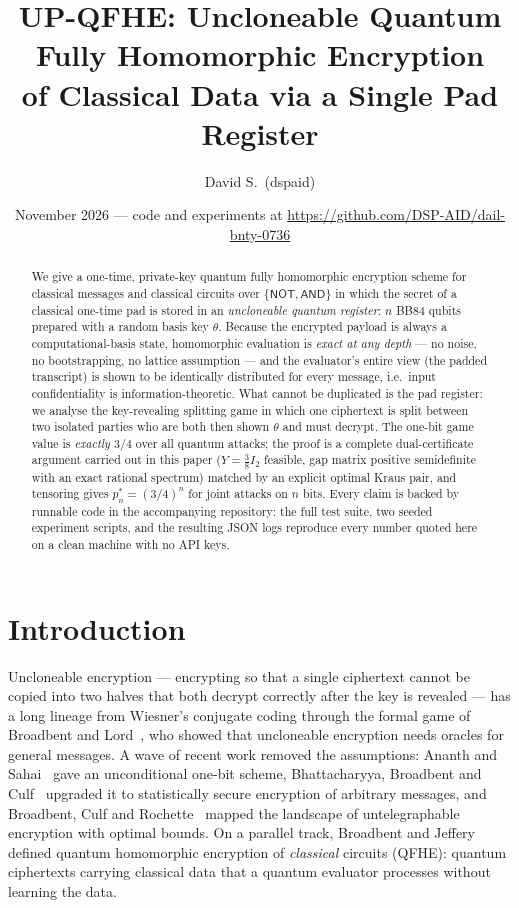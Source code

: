 \documentclass[11pt]{article}
\title{\bfseries UP-QFHE: Uncloneable Quantum Fully Homomorphic Encryption\\
of Classical Data via a Single Pad Register}
\author{David S.~(dspaid)}
\date{November 2026 --- code and experiments at \url{https://github.com/DSP-AID/dail-bnty-0736}}
\theoremstyle{definition}
\begin{document}
\maketitle

\begin{abstract}
We give a one-time, private-key quantum fully homomorphic encryption scheme for
classical messages and classical circuits over $\{\mathsf{NOT},\mathsf{AND}\}$
in which the secret of a classical one-time pad is stored in an \emph{uncloneable
quantum register}: $n$ BB84 qubits prepared with a random basis key $\theta$.
Because the encrypted payload is always a computational-basis state, homomorphic
evaluation is \emph{exact at any depth} --- no noise, no bootstrapping, no
lattice assumption --- and the evaluator's entire view (the padded transcript)
is shown to be identically distributed for every message, i.e.\ input
confidentiality is information-theoretic.  What cannot be duplicated is the pad
register: we analyse the key-revealing splitting game in which one ciphertext is
split between two isolated parties who are both then shown $\theta$ and must
decrypt.  The one-bit game value is \emph{exactly $3/4$} over all quantum
attacks; the proof is a complete dual-certificate argument carried out in this
paper ($Y=\tfrac38 I_2$ feasible, gap matrix positive semidefinite with an
exact rational spectrum) matched by an explicit optimal Kraus pair, and
tensoring gives $p_n^\ast = (3/4)^n$ for joint attacks on $n$ bits.  Every claim is backed by
runnable code in the accompanying repository: the full test suite, two seeded
experiment scripts, and the resulting JSON logs reproduce every number quoted
here on a clean machine with no API keys.
\end{abstract}

\section{Introduction}

Uncloneable encryption --- encrypting so that a single ciphertext cannot be
copied into two halves that both decrypt correctly after the key is revealed
--- has a long lineage from Wiesner's conjugate coding through the formal game
of Broadbent and Lord~\cite{bl20}, who showed that uncloneable encryption needs
oracles for general messages.  A wave of recent work removed the assumptions:
Ananth and Sahai~\cite{as26} gave an unconditional one-bit scheme, Bhattacharyya,
Broadbent and Culf~\cite{bbc26} upgraded it to statistically secure encryption
of arbitrary messages, and Broadbent, Culf and Rochette~\cite{bcr26} mapped the
landscape of untelegraphable encryption with optimal bounds.  On a parallel
track, Broadbent and Jeffery~\cite{bj15} defined quantum homomorphic encryption
of \emph{classical} circuits (QFHE): quantum ciphertexts carrying classical
data that a quantum evaluator processes without learning the data.
\end{document}
